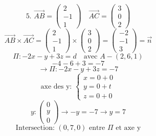\documentclass{article}
\begin{document}

\[
\text{5. } \vec{AB} = \begin{pmatrix} 2 \\ -1 \\ 1 \end{pmatrix} \quad \vec{AC} = \begin{pmatrix} 3 \\ 0 \\ 2 \end{pmatrix}
\]
\[
\vec{AB} \times \vec{AC} = \begin{pmatrix} 2 \\ -1 \\ 1 \end{pmatrix} \times \begin{pmatrix} 3 \\ 0 \\ 2 \end{pmatrix} = \begin{pmatrix} -2 \\ -1 \\ 3 \end{pmatrix} = \vec{n}
\]
\[
\Pi : -2x - y + 3z = d \quad \text{avec } A-(2, 6, 1)
\]
\[
-4 - 6 + 3 = -7
\]
\[
\rightarrow \Pi : -2x - y + 3z = -7
\]
\[
\text{axe des y: } \begin{cases} x = 0 + 0 \\ y = 0 + t \\ z = 0 + 0 \end{cases}
\]
\[
y : \begin{pmatrix} 0 \\ y \\ 0 \end{pmatrix} \rightarrow -y = -7 \rightarrow y = 7
\]
\[
\text{Intersection: } (0, 7, 0) \text{ entre } \Pi \text{ et axe y}
\]
\end{document}
